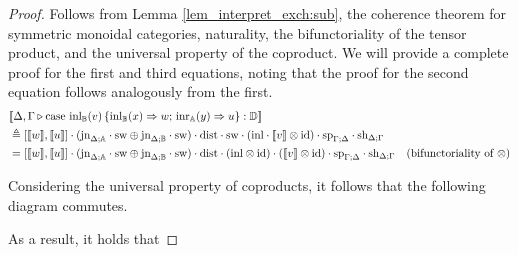 \documentclass[10pt,a4paper]{amsart}
\theoremstyle{definition}
\theoremstyle{definition}
\theoremstyle{definition}
\theoremstyle{definition}
\theoremstyle{definition}
\theoremstyle{definition}
\begin{document}
\begin{proof}
  Follows from Lemma \autoref{lem_interpret_exch:sub}, the coherence theorem for symmetric monoidal categories, naturality,  the bifunctoriality of the tensor product, and the universal property of the coproduct.   
  We will provide a complete proof for the first and third equations, noting that the proof for the second equation follows analogously from the first.
  \begin{align*}
    &\llbracket \Delta,\Gamma \triangleright  \text{case }  \text{inl}_{\mathbb{B}}(v)\, \{\text{inl}_{\mathbb{B}} (x) \Rightarrow w ;\, \text{inr}_{\mathbb{A}} (y) \Rightarrow u\}: \mathbb{D}\rrbracket \\
    & \triangleq  [\llbracket w\rrbracket,\llbracket u \rrbracket] \cdot (\text{jn}_{\Delta;\mathbb{A}} \cdot \mathrm{sw} \oplus \text{jn}_{\Delta;\mathbb{B}} \cdot \mathrm{sw}  ) \cdot \mathrm{dist} \cdot \mathrm{sw} \cdot (\mathrm{inl} \cdot \llbracket  v \rrbracket \otimes \text{id}) \cdot \text{sp}_{\Gamma;\Delta} \cdot \text{sh}_{\Delta;\Gamma} \\
    & =  [\llbracket w\rrbracket,\llbracket u \rrbracket] \cdot (\text{jn}_{\Delta;\mathbb{A}} \cdot \mathrm{sw} \oplus \text{jn}_{\Delta;\mathbb{B}} \cdot \mathrm{sw} ) \cdot \mathrm{dist} \cdot (\mathrm{inl} \otimes \text{id}  ) \cdot ( \llbracket  v \rrbracket \otimes \text{id}) \cdot \text{sp}_{\Gamma;\Delta} \cdot \text{sh}_{\Delta;\Gamma} &{(\text{bifunctoriality  of } \otimes}) 
  \end{align*}


Considering the universal property of coproducts, it follows that the following diagram commutes.


As a result, it holds that


\end{proof}
\end{document}
